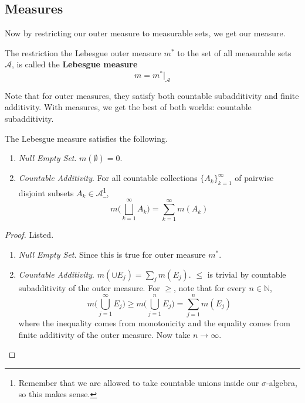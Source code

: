 \subsection{Measures} 

  Now by restricting our outer measure to measurable sets, we get our measure. 

  \begin{definition}
    The restriction the Lebesgue outer measure $m^\ast$ to the set of all measurable sets $\mathcal{A}$, is called the \textbf{Lebesgue measure} 
    \begin{equation}
      m = m^\ast \big|_{\mathcal{A}}
    \end{equation}
  \end{definition}

  Note that for outer measures, they satisfy both countable subadditivity and finite additivity. With measures, we get the best of both worlds: countable subadditivity. 

  \begin{lemma}
    The Lebesgue measure satisfies the following. 
    \begin{enumerate}
      \item \textit{Null Empty Set}. $m(\emptyset) = 0$. 
      \item \textit{Countable Additivity}. For all countable collections $\{A_k\}_{k=1}^\infty$ of pairwise disjoint subsets $A_k \in \mathcal{A}$\footnote{Remember that we are allowed to take countable unions inside our $\sigma$-algebra, so this makes sense.}, 
      \begin{equation}
        m \bigg( \bigsqcup_{k=1}^\infty A_k \bigg) = \sum_{k=1}^\infty m(A_k)
      \end{equation}
    \end{enumerate}
  \end{lemma}
  \begin{proof}
    Listed. 
    \begin{enumerate}
      \item \textit{Null Empty Set}. Since this is true for outer measure $m^\ast$. 
      \item \textit{Countable Additivity}. $m( \cup E_j) = \sum_j m(E_j)$. $\leq$ is trivial by countable subadditivity of the outer measure. For $\geq$, note that for every $n \in \mathbb{N}$, 
      \begin{equation}
        m \bigg( \bigcup_{j=1}^\infty E_j \bigg) \geq m \bigg( \bigcup_{j=1}^n E_j \bigg) = \sum_{j=1}^n m(E_j) 
      \end{equation}
      where the inequality comes from monotonicity and the equality comes from finite additivity of the outer measure. Now take $n \to \infty$. 
    \end{enumerate}
  \end{proof}

